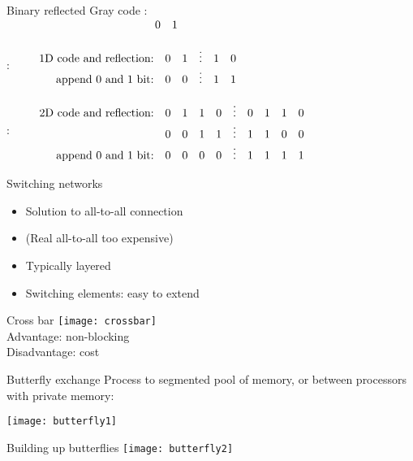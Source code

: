 \begin{numberedframe}{Binary reflected Gray code}
\small
\hbox{:
$\vcenter{$
\begin{array}{rll}
  \hphantom{1D code and reflection:}&0&1\\
\end{array}$}
$}

\hbox{:
$\vcenter{$
\begin{array}{rccccc}
  \hbox{1D code and reflection:}&0&1&\vdots&1&0\\
  \hbox{append 0 and 1 bit:}&0&0&\vdots&1&1
\end{array}$}
$}

\hbox{:
$\vcenter{$
\begin{array}{rccccccccc}
  \hbox{2D code and reflection:}&0&1&1&0&\vdots&0&1&1&0\\
  &0&0&1&1&\vdots&1&1&0&0\\
  \hbox{append 0 and 1 bit:}&0&0&0&0&\vdots&1&1&1&1
\end{array}$}
$}
\end{numberedframe}

\begin{numberedframe}{Switching networks}
  \begin{itemize}
  \item Solution to all-to-all connection
  \item (Real all-to-all too expensive)
  \item Typically layered
  \item Switching elements: easy to extend
  \end{itemize}
\end{numberedframe}

\begin{numberedframe}{Cross bar}
    \texttt{[image: crossbar]}\\
    Advantage: non-blocking\\
    Disadvantage: cost
\end{numberedframe}

\begin{numberedframe}{Butterfly exchange}
  Process to segmented pool of memory, or between processors with private memory:

    \texttt{[image: butterfly1]}
\end{numberedframe}

\begin{numberedframe}{Building up butterflies}
      \texttt{[image: butterfly2]}
\end{numberedframe}

